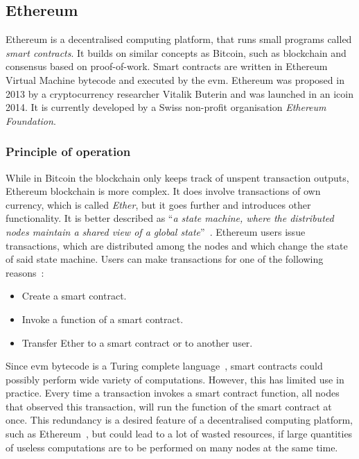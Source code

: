 \subsection{Ethereum}

Ethereum is a decentralised computing platform, that runs small programs called \textit{smart contracts}. It builds on similar concepts as Bitcoin, such as blockchain and consensus based on proof-of-work. Smart contracts are written in Ethereum Virtual Machine bytecode and executed by the \acrfull{evm}. Ethereum was proposed in 2013 by a cryptocurrency researcher Vitalik Buterin and was launched in an \acrlong{ico}\footnotemark  in 2014. 
% 
% 
It is currently developed by a Swiss non-profit organisation \textit{Ethereum Foundation}.\footnotemark
% 

\subsubsection{Principle of operation}
While in Bitcoin the blockchain only keeps track of unspent transaction outputs, Ethereum blockchain is more complex. It does involve transactions of own currency, which is called \textit{Ether}, but it goes further and introduces other functionality. It is better described as ``\textit{a state machine, where the distributed nodes maintain a shared view of a global state}''~\cite{Tikhomirov2018Ethereum:Perspectives}. Ethereum users issue transactions, which are distributed among the nodes and which change the state of said state machine. Users can make transactions for one of the following reasons~\cite{Atzei2017ASoK}:
\begin{itemize}[noitemsep]
    \item Create a smart contract.
    \item Invoke a function of a smart contract.
    \item Transfer Ether to a smart contract or to another user.
\end{itemize}

Since \acrshort{evm} bytecode is a Turing complete language~\cite{Tikhomirov2018Ethereum:Perspectives, Atzei2017ASoK, Dannen2017IntroducingSolidity}, smart contracts could possibly perform wide variety of computations. However, this has limited use in practice. Every time a transaction invokes a smart contract function, all nodes that observed this transaction, will run the function of the smart contract at once. This redundancy is a desired feature of a decentralised computing platform, such as Ethereum~\cite{EthereumCommunityEthereumDocumentation}, but could lead to a lot of wasted resources, if large quantities of useless computations are to be performed on many nodes at the same time.

